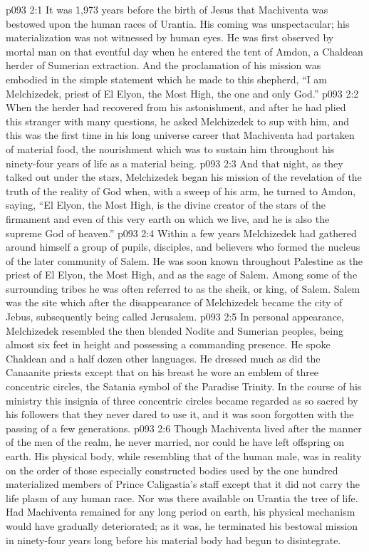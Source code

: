 \vs p093 2:1 It was 1,973 years before the birth of Jesus that Machiventa was bestowed upon the human races of Urantia. His coming was unspectacular; his materialization was not witnessed by human eyes. He was first observed by mortal man on that eventful day when he entered the tent of Amdon, a Chaldean herder of Sumerian extraction. And the proclamation of his mission was embodied in the simple statement which he made to this shepherd, “I am Melchizedek, priest of El Elyon, the Most High, the one and only God.”
\vs p093 2:2 When the herder had recovered from his astonishment, and after he had plied this stranger with many questions, he asked Melchizedek to sup with him, and this was the first time in his long universe career that Machiventa had partaken of material food, the nourishment which was to sustain him throughout his ninety\hyp{}four years of life as a material being.
\vs p093 2:3 And that night, as they talked out under the stars, Melchizedek began his mission of the revelation of the truth of the reality of God when, with a sweep of his arm, he turned to Amdon, saying, “El Elyon, the Most High, is the divine creator of the stars of the firmament and even of this very earth on which we live, and he is also the supreme God of heaven.”
\pc \vs p093 2:4 Within a few years Melchizedek had gathered around himself a group of pupils, disciples, and believers who formed the nucleus of the later community of Salem. He was soon known throughout Palestine as the priest of El Elyon, the Most High, and as the sage of Salem. Among some of the surrounding tribes he was often referred to as the sheik, or king, of Salem. Salem was the site which after the disappearance of Melchizedek became the city of Jebus, subsequently being called Jerusalem.
\pc \vs p093 2:5 In personal appearance, Melchizedek resembled the then blended Nodite and Sumerian peoples, being almost six feet in height and possessing a commanding presence. He spoke Chaldean and a half dozen other languages. He dressed much as did the Canaanite priests except that on his breast he wore an emblem of three concentric circles, the Satania symbol of the Paradise Trinity. In the course of his ministry this insignia of three concentric circles became regarded as so sacred by his followers that they never dared to use it, and it was soon forgotten with the passing of a few generations.
\vs p093 2:6 Though Machiventa lived after the manner of the men of the realm, he never married, nor could he have left offspring on earth. His physical body, while resembling that of the human male, was in reality on the order of those especially constructed bodies used by the one hundred materialized members of Prince Caligastia’s staff except that it did not carry the life plasm of any human race. Nor was there available on Urantia the tree of life. Had Machiventa remained for any long period on earth, his physical mechanism would have gradually deteriorated; as it was, he terminated his bestowal mission in ninety\hyp{}four years long before his material body had begun to disintegrate.
